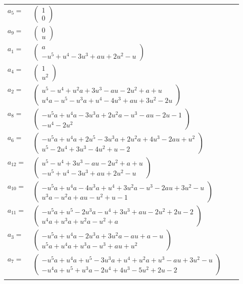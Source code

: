 \documentclass[1p]{elsarticle_modified}
\theoremstyle{definition}
\begin{document}
\begin{tabular}{m{7pt} m{180pt} m{7pt} m{180pt} }
\flushright $a_{5}=$&$\begin{pmatrix}1\\0\end{pmatrix}$ \\
\flushright $a_{9}=$&$\begin{pmatrix}0\\u\end{pmatrix}$ \\
\flushright $a_{1}=$&$\begin{pmatrix}a\\- u^5+u^4-3 u^3+a u+2 u^2- u\end{pmatrix}$ \\
\flushright $a_{4}=$&$\begin{pmatrix}1\\u^2\end{pmatrix}$ \\
\flushright $a_{2}=$&$\begin{pmatrix}u^5- u^4+u^2 a+3 u^3- a u-2 u^2+a+u\\u^4 a- u^5- u^3 a+u^4-4 u^3+a u+3 u^2-2 u\end{pmatrix}$ \\
\flushright $a_{8}=$&$\begin{pmatrix}- u^5 a+u^4 a-3 u^3 a+2 u^2 a- u^3- a u-2 u-1\\- u^4-2 u^2\end{pmatrix}$ \\
\flushright $a_{6}=$&$\begin{pmatrix}- u^5 a+u^4 a+2 u^5-3 u^3 a+2 u^2 a+4 u^3-2 a u+u^2\\u^5-2 u^4+3 u^3-4 u^2+u-2\end{pmatrix}$ \\
\flushright $a_{12}=$&$\begin{pmatrix}u^5- u^4+3 u^3- a u-2 u^2+a+u\\- u^5+u^4-3 u^3+a u+2 u^2- u\end{pmatrix}$ \\
\flushright $a_{10}=$&$\begin{pmatrix}- u^5 a+u^4 a-4 u^3 a+u^4+3 u^2 a- u^3-2 a u+3 u^2- u\\u^3 a- u^2 a+a u- u^2+u-1\end{pmatrix}$ \\
\flushright $a_{11}=$&$\begin{pmatrix}- u^5 a+u^5-2 u^3 a- u^4+3 u^3+a u-2 u^2+2 u-2\\u^4 a+u^3 a+u^2 a- u^2+a\end{pmatrix}$ \\
\flushright $a_{3}=$&$\begin{pmatrix}- u^5 a+u^4 a-2 u^3 a+3 u^2 a- a u+a- u\\u^5 a+u^4 a+u^3 a- u^3+a u+u^2\end{pmatrix}$ \\
\flushright $a_{7}=$&$\begin{pmatrix}- u^5 a+u^4 a+u^5-3 u^3 a+u^4+u^2 a+u^3- a u+3 u^2- u\\- u^4 a+u^5+u^3 a-2 u^4+4 u^3-5 u^2+2 u-2\end{pmatrix}$\\&\end{tabular}
\end{document}
